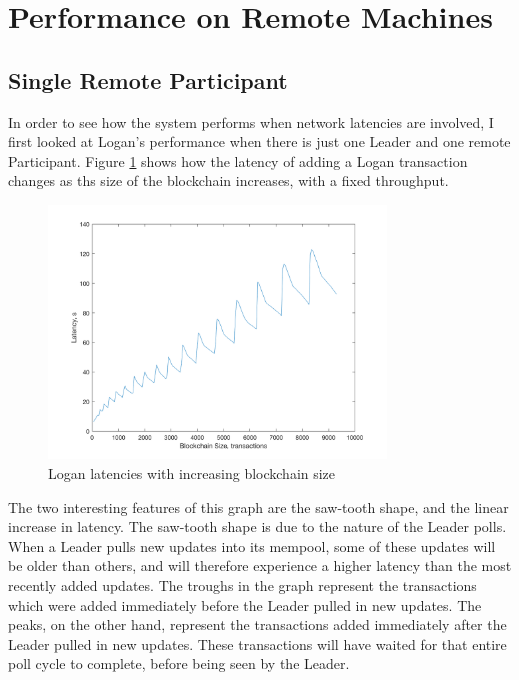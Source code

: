 \documentclass[12pt,a4paper,twoside,openright]{report}
\begin{document}
	\section{Performance on Remote Machines}
	\subsection{Single Remote Participant}
	In order to see how the system performs when network latencies are involved, I first looked at Logan's performance when there is just one Leader and one remote Participant.
	Figure \ref{figs:remlatencysize} shows how the latency of adding a Logan transaction changes as ths size of the blockchain increases, with a fixed throughput.
	\begin{figure}
		\centering
		\includegraphics[width=0.8\textwidth]{figs/remote_latency_size.png}
		\caption{Logan latencies with increasing blockchain size}
		\label{figs:remlatencysize}
	\end{figure}
	The two interesting features of this graph are the saw-tooth shape, and the linear increase in latency.
	The saw-tooth shape is due to the nature of the Leader polls.
	When a Leader pulls new updates into its mempool, some of these updates will be older than others, and will therefore experience a higher latency than the most recently added updates. 
	The troughs in the graph represent the transactions which were added immediately before the Leader pulled in new updates.
	The peaks, on the other hand, represent the transactions added immediately after the Leader pulled in new updates.
	These transactions will have waited for that entire poll cycle to complete, before being seen by the Leader.\\
\end{document}
